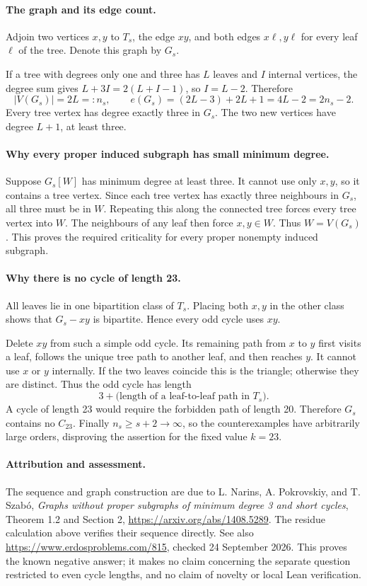 \paragraph{The graph and its edge count.}
Adjoin two vertices \(x,y\) to \(T_s\), the edge \(xy\), and both edges \(x\ell,y\ell\) for every leaf \(\ell\) of the tree. Denote this graph by \(G_s\).

If a tree with degrees only one and three has \(L\) leaves and \(I\) internal vertices, the degree sum gives
\(L+3I=2(L+I-1)\), so \(I=L-2\). Therefore
\[
 |V(G_s)|=2L=:n_s,
 \qquad
 e(G_s)=(2L-3)+2L+1=4L-2=2n_s-2.
\tag{3}
\]
Every tree vertex has degree exactly three in \(G_s\). The two new vertices have degree \(L+1\), at least three.

\paragraph{Why every proper induced subgraph has small minimum degree.}
Suppose \(G_s[W]\) has minimum degree at least three. It cannot use only \(x,y\), so it contains a tree vertex. Since each tree vertex has exactly three neighbours in \(G_s\), all three must be in \(W\). Repeating this along the connected tree forces every tree vertex into \(W\). The neighbours of any leaf then force \(x,y\in W\). Thus \(W=V(G_s)\). This proves the required criticality for every proper nonempty induced subgraph.

\paragraph{Why there is no cycle of length 23.}
All leaves lie in one bipartition class of \(T_s\). Placing both \(x,y\) in the other class shows that \(G_s-xy\) is bipartite. Hence every odd cycle uses \(xy\).

Delete \(xy\) from such a simple odd cycle. Its remaining path from \(x\) to \(y\) first visits a leaf, follows the unique tree path to another leaf, and then reaches \(y\). It cannot use \(x\) or \(y\) internally. If the two leaves coincide this is the triangle; otherwise they are distinct. Thus the odd cycle has length
\[
 3+\text{(length of a leaf-to-leaf path in }T_s).
\]
A cycle of length 23 would require the forbidden path of length 20. Therefore \(G_s\) contains no \(C_{23}\). Finally \(n_s\geq s+2\to\infty\), so the counterexamples have arbitrarily large orders, disproving the assertion for the fixed value \(k=23\).

\paragraph{Attribution and assessment.}
The sequence and graph construction are due to L. Narins, A. Pokrovskiy, and T. Szab\'o, \emph{Graphs without proper subgraphs of minimum degree 3 and short cycles}, Theorem 1.2 and Section 2, \url{https://arxiv.org/abs/1408.5289}. The residue calculation above verifies their sequence directly. See also \url{https://www.erdosproblems.com/815}, checked 24 September 2026. This proves the known negative answer; it makes no claim concerning the separate question restricted to even cycle lengths, and no claim of novelty or local Lean verification.
